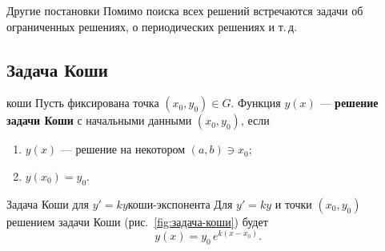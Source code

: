 \begin{Remark}{Другие постановки}{}
	Помимо поиска всех решений встречаются задачи об ограниченных
	решениях, о периодических решениях и т.\,д.
\end{Remark}

\subsection{Задача Коши}

\begin{Definition}{}{коши}
	Пусть фиксирована точка $(x_0, y_0) \in G$. Функция $y(x)$ ---
	\textbf{решение задачи Коши} с начальными данными $(x_0,y_0)$, если
	\begin{enumerate}
		\item $y(x)$ --- решение на некотором $(a,b) \ni x_0$;
		\item $y(x_0) = y_0$.
	\end{enumerate}
\end{Definition}

\begin{Example}{Задача Коши для $y' = ky$}{коши-экспонента}
	Для $y' = ky$ и точки $(x_0,y_0)$ решением задачи Коши (рис.~\ref{fig:задача-коши}) будет
	\[
	y(x) = y_0\, e^{k(x - x_0)}.
	\]
\end{Example}

